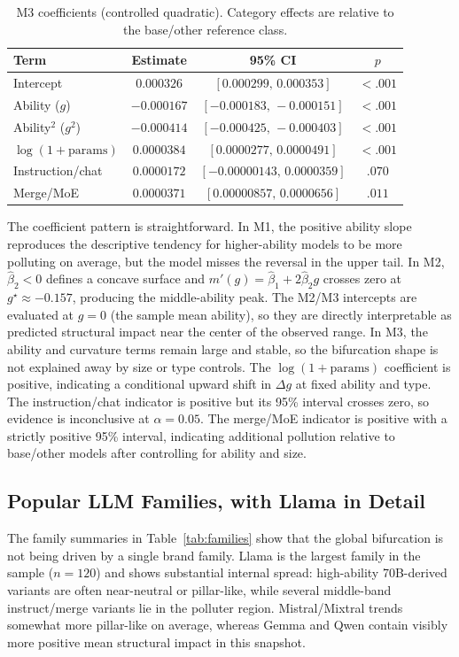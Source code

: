 \documentclass[11pt]{article}
\begin{document}
\begin{table}[H]
\centering
\small
\begin{tabular}{lccc}
\toprule
Term & Estimate & 95\% CI & $p$ \\
\midrule
Intercept & $0.000326$ & $[0.000299,\,0.000353]$ & $<.001$ \\
Ability ($g$) & $-0.000167$ & $[-0.000183,\,-0.000151]$ & $<.001$ \\
Ability$^2$ ($g^2$) & $-0.000414$ & $[-0.000425,\,-0.000403]$ & $<.001$ \\
$\log(1+\mathrm{params})$ & $0.0000384$ & $[0.0000277,\,0.0000491]$ & $<.001$ \\
Instruction/chat & $0.0000172$ & $[-0.00000143,\,0.0000359]$ & $.070$ \\
Merge/MoE & $0.0000371$ & $[0.00000857,\,0.0000656]$ & $.011$ \\
\bottomrule
\end{tabular}
\caption{M3 coefficients (controlled quadratic). Category effects are relative to the base/other reference class.}
\label{tab:reg_full}
\end{table}

The coefficient pattern is straightforward. In M1, the positive ability slope reproduces the descriptive tendency for higher-ability models to be more polluting on average, but the model misses the reversal in the upper tail. In M2, $\hat{\beta}_2<0$ defines a concave surface and $m'(g)=\hat{\beta}_1+2\hat{\beta}_2 g$ crosses zero at $g^\star\approx-0.157$, producing the middle-ability peak. The M2/M3 intercepts are evaluated at $g=0$ (the sample mean ability), so they are directly interpretable as predicted structural impact near the center of the observed range. In M3, the ability and curvature terms remain large and stable, so the bifurcation shape is not explained away by size or type controls. The $\log(1+\mathrm{params})$ coefficient is positive, indicating a conditional upward shift in $\Delta g$ at fixed ability and type. The instruction/chat indicator is positive but its 95\% interval crosses zero, so evidence is inconclusive at $\alpha=0.05$. The merge/MoE indicator is positive with a strictly positive 95\% interval, indicating additional pollution relative to base/other models after controlling for ability and size.

\subsection{Popular LLM Families, with Llama in Detail}
The family summaries in Table~\ref{tab:families} show that the global bifurcation is not being driven by a single brand family. Llama is the largest family in the sample ($n=120$) and shows substantial internal spread: high-ability 70B-derived variants are often near-neutral or pillar-like, while several middle-band instruct/merge variants lie in the polluter region. Mistral/Mixtral trends somewhat more pillar-like on average, whereas Gemma and Qwen contain visibly more positive mean structural impact in this snapshot.
\end{document}
